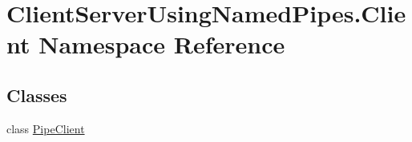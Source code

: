 \hypertarget{namespace_client_server_using_named_pipes_1_1_client}{}\section{Client\+Server\+Using\+Named\+Pipes.\+Client Namespace Reference}
\label{namespace_client_server_using_named_pipes_1_1_client}
\subsection*{Classes}
\begin{DoxyCompactItemize}
\item 
class \hyperlink{class_client_server_using_named_pipes_1_1_client_1_1_pipe_client}{Pipe\+Client}
\end{DoxyCompactItemize}
